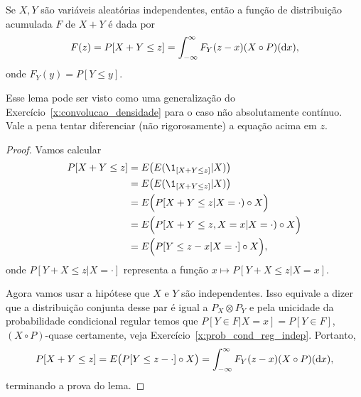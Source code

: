 \begin{lemma}
  Se $X, Y$ são variáveis aleatórias independentes, então a função de distribuição acumulada $F$ de $X + Y$ é dada por
  \begin{equation}
    F(z) = P[X + Y \leq z] = \int_{-\infty}^\infty F_Y(z - x) (X \circ P) (\mathop{}\!\mathrm{d} x),
  \end{equation}
  onde $F_Y(y) = P[Y \leq y]$.
\end{lemma}

Esse lema pode ser visto como uma generalização do Exercício~\ref{x:convolucao_densidade} para o caso não absolutamente contínuo.
Vale a pena tentar diferenciar (não rigorosamente) a equação acima em $z$.

\begin{proof}
  Vamos calcular
  \begin{equation}
    \begin{split}
      P[X + Y \leq z] & = E\big( E(\1_{[X + Y \leq z]} | X) \big)\\
      & = E\big( E(\1_{[X + Y \leq z]} | X) \big)\\
      & = E\Big( P[X + Y \leq z| X = \cdot) \circ X \Big)\\
      & = E\Big( P[X + Y \leq z, X = x| X = \cdot) \circ X \Big)\\
      & = E\Big( P[Y \leq z - x| X = \cdot] \circ X \Big),
    \end{split}
  \end{equation}
  onde $P[Y + X \leq z| X = \cdot]$ representa a função $x \mapsto P[Y + X \leq z | X = x]$.

  Agora vamos usar a hipótese que $X$ e $Y$ são independentes.
  Isso equivale a dizer que a distribuição conjunta desse par é igual a $P_X \otimes P_Y$ e pela unicidade da probabilidade condicional regular temos que $P[Y \in F | X = x] = P[Y \in F]$, $(X \circ P)$-quase certamente, veja Exercício~\ref{x:prob_cond_reg_indep}.
  Portanto,
  \begin{equation}
    P[X + Y \leq z] = E\big( P[Y \leq z - \cdot] \circ X \big) = \int_{-\infty}^\infty F_Y(z - x) (X \circ P) (\mathop{}\!\mathrm{d} x),
  \end{equation}
  terminando a prova do lema.
\end{proof}


